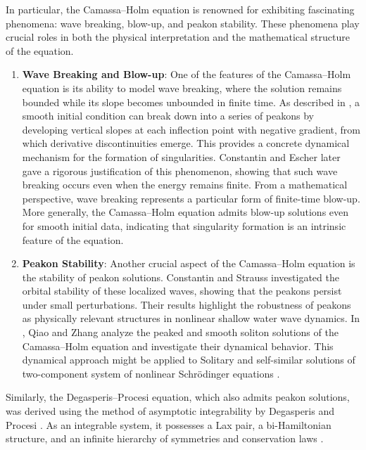 \documentclass[11pt]{article}
\begin{document}
In particular, the Camassa–Holm equation is renowned for exhibiting fascinating phenomena: wave breaking, blow-up, and peakon stability. These phenomena play crucial roles in both the physical interpretation and the mathematical structure of the equation.

\begin{enumerate}

    \item \textbf{Wave Breaking and Blow-up}: 
    One of the features of the Camassa–Holm equation is its ability to model wave breaking, 
    where the solution remains bounded while its slope becomes unbounded in finite time. 
    As described in \cite{camassa1993integrable}, a smooth initial condition can break down into a series of peakons 
    by developing vertical slopes at each inflection point with negative gradient, from which derivative discontinuities emerge. This provides a concrete dynamical mechanism for the formation of singularities. 
    Constantin and Escher \cite{constantin1998global,constantin1998wave} later gave a rigorous justification of this phenomenon, 
    showing that such wave breaking occurs even when the energy remains finite. From a mathematical perspective, wave breaking represents a particular form of finite-time blow-up. 
    More generally, the Camassa–Holm equation admits blow-up solutions even for smooth initial data, 
    indicating that singularity formation is an intrinsic feature of the equation.

    \item \textbf{Peakon Stability}: 
    Another crucial aspect of the Camassa–Holm equation is the stability of peakon solutions.
    Constantin and Strauss \cite{constantin2000stability} investigated the orbital stability of these localized waves,
 showing that the peakons persist under small perturbations. Their results highlight the robustness of peakons as
    physically relevant structures in nonlinear shallow water wave dynamics. In \cite{qiao2006peaked}, Qiao and
    Zhang analyze the peaked and smooth soliton solutions of the Camassa–Holm equation and investigate their dynamical
    behavior. This dynamical approach might be applied to Solitary and self-similar solutions of two-component system of nonlinear Schr\"{o}dinger equations \cite{lin2006solitary}. 

\end{enumerate}

Similarly, the Degasperis–Procesi equation, which also admits peakon solutions, was derived using the method of asymptotic
integrability by Degasperis and Procesi \cite{degasperis1999asymptotic}. As an integrable system, it possesses a Lax
pair, a bi-Hamiltonian structure, and an infinite hierarchy of symmetries and conservation laws
\cite{degasperis2002new}.
\end{document}
